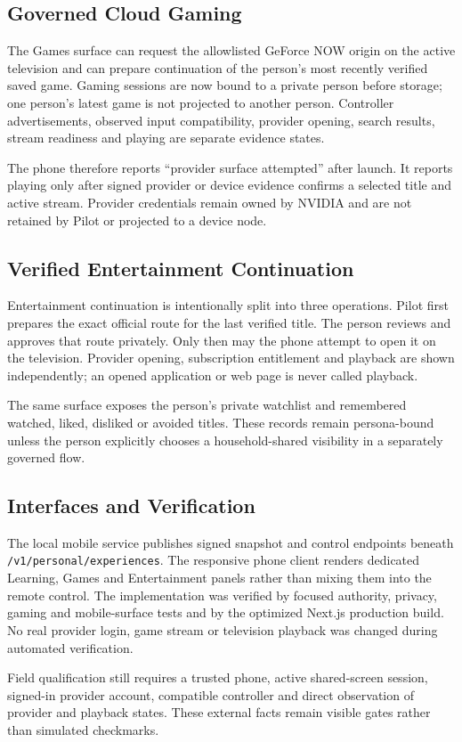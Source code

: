 \subsection{Governed Cloud Gaming}

The Games surface can request the allowlisted GeForce NOW origin on the active television and can
prepare continuation of the person's most recently verified saved game.  Gaming sessions are now
bound to a private person before storage; one person's latest game is not projected to another
person.  Controller advertisements, observed input compatibility, provider opening, search
results, stream readiness and playing are separate evidence states.

The phone therefore reports ``provider surface attempted'' after launch.  It reports playing only
after signed provider or device evidence confirms a selected title and active stream.  Provider
credentials remain owned by NVIDIA and are not retained by Pilot or projected to a device node.

\subsection{Verified Entertainment Continuation}

Entertainment continuation is intentionally split into three operations.  Pilot first prepares
the exact official route for the last verified title.  The person reviews and approves that route
privately.  Only then may the phone attempt to open it on the television.  Provider opening,
subscription entitlement and playback are shown independently; an opened application or web page
is never called playback.

The same surface exposes the person's private watchlist and remembered watched, liked, disliked or
avoided titles.  These records remain persona-bound unless the person explicitly chooses a
household-shared visibility in a separately governed flow.

\subsection{Interfaces and Verification}

The local mobile service publishes signed snapshot and control endpoints beneath
\texttt{/v1/personal/experiences}.  The responsive phone client renders dedicated Learning, Games
and Entertainment panels rather than mixing them into the remote control.  The implementation was
verified by focused authority, privacy, gaming and mobile-surface tests and by the optimized Next.js
production build.  No real provider login, game stream or television playback was changed during
automated verification.

Field qualification still requires a trusted phone, active shared-screen session, signed-in
provider account, compatible controller and direct observation of provider and playback states.
These external facts remain visible gates rather than simulated checkmarks.

\endgroup
